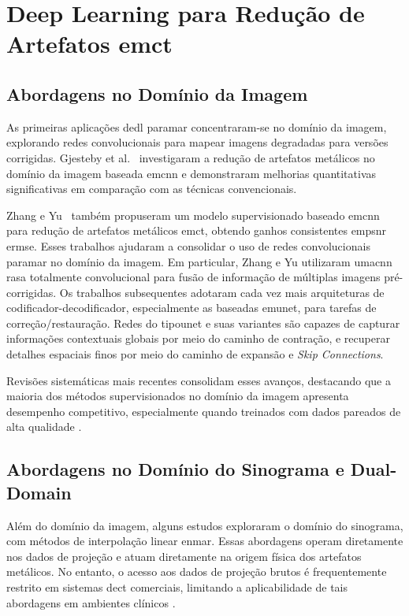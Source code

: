 \section{Deep Learning para Redução de Artefatos em\acrshort{ct}}

\subsection{Abordagens no Domínio da Imagem}
As primeiras aplicações de\acrshort{dl} para\acrshort{mar} concentraram-se no domínio da imagem, explorando redes convolucionais para mapear imagens degradadas para versões corrigidas. Gjesteby et al.~\cite{gjestebyDeepLearningMethods2017} investigaram a redução de artefatos metálicos no domínio da imagem baseada em\acrshort{cnn} e demonstraram melhorias quantitativas significativas em comparação com as técnicas convencionais.

Zhang e Yu~\cite{zhangConvolutionalNeuralNetwork2018} também propuseram um modelo supervisionado baseado em\acrfull{cnn} para redução de artefatos metálicos em\acrshort{ct}, obtendo ganhos consistentes em\acrfull{psnr} e\acrfull{rmse}. Esses trabalhos ajudaram a consolidar o uso de redes convolucionais para\acrshort{mar} no domínio da imagem. Em particular, Zhang e Yu utilizaram uma\acrshort{cnn} rasa totalmente convolucional para fusão de informação de múltiplas imagens pré-corrigidas. Os trabalhos subsequentes adotaram cada vez mais arquiteturas de codificador-decodificador, especialmente as baseadas em\acrshort{unet}, para tarefas de correção/restauração. Redes do tipo\acrshort{unet} e suas variantes são capazes de capturar informações contextuais globais por meio do caminho de contração, e recuperar detalhes espaciais finos por meio do caminho de expansão e \textit{Skip Connections}\cite{ronnebergerUNetConvolutionalNetworks2015}.

Revisões sistemáticas mais recentes consolidam esses avanços, destacando que a maioria dos métodos supervisionados no domínio da imagem apresenta desempenho competitivo, especialmente quando treinados com dados pareados de alta qualidade \cite{kleberAdvancementsSupervisedDeep2024,sahuTransformingCTImaging2025}.

\subsection{Abordagens no Domínio do Sinograma e Dual-Domain}
Além do domínio da imagem, alguns estudos exploraram o domínio do sinograma, com métodos de interpolação linear e\acrfull{nmar}. Essas abordagens operam diretamente nos dados de projeção e atuam diretamente na origem física dos artefatos metálicos\cite{meyerNormalizedMetalArtifact2009}. No entanto, o acesso aos dados de projeção brutos é frequentemente restrito em sistemas de\acrshort{ct} comerciais, limitando a aplicabilidade de tais abordagens em ambientes clínicos \cite{gjestebyDeepLearningMethods2017}.


